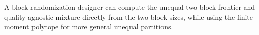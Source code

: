 A block-randomization designer can compute the unequal two-block frontier and quality-agnostic mixture directly from the two block sizes, while using the finite moment polytope for more general unequal partitions.